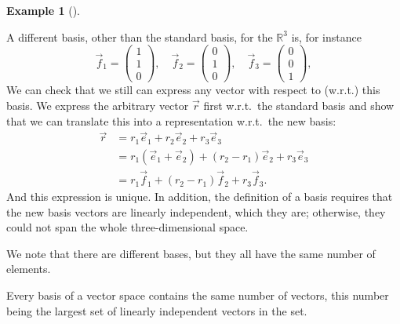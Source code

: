 \documentclass[
  a4paper,
  DIV=11,
  numbers=noendperiod,
  oneside]{scrreprt}
\theoremstyle{definition}
\newtheorem{example}{Example}[chapter]
\theoremstyle{remark}
\newenvironment{fbxSimple}[3]{\begin{tcolorbox}[enhanced, breakable,%
attach boxed title to top*={xshift=1.4pt},
boxed title style={boxrule=0.0mm, fuzzy shadow={1pt}{-1pt}{0mm}{0.1mm}{gray}, arc=.3em, rounded corners=east, sharp corners=west}, colframe=#1-color2, colbacktitle=#1-color1, colback = white, coltitle=black,  titlerule=0mm, toprule=0pt, bottomrule=.7pt, leftrule=.3em, rightrule=.7pt, outer arc=.3em,  	left=.5em, right=.5em, bottomtitle=1mm, toptitle=1mm,title=\textbf{#2}\hspace{0.5em}{#3}]}
{\end{tcolorbox}}
\begin{document}
\begin{example}[]\protect\hypertarget{exm-}{}\label{exm-}

A different basis, other than the standard basis, for the
\(\mathbb{R}^{3}\) is, for instance
\[\vec{f}_{1} =  \scriptscriptstyle \begin{pmatrix}   1\\ 1 \\ 0   \end{pmatrix} \textstyle, \quad \vec{f}_{2} =  \scriptscriptstyle \begin{pmatrix}   0\\ 1 \\ 0   \end{pmatrix} \textstyle, \quad \vec{f}_{3} =  \scriptscriptstyle \begin{pmatrix}   0\\ 0 \\ 1  \end{pmatrix} \textstyle,\]
We can check that we still can express any vector with respect to
(w.r.t.) this basis. We express the arbitrary vector \(\vec{r}\) first
w.r.t.~the standard basis and show that we can translate this into a
representation w.r.t.~the new basis: \[\begin{aligned}
 \vec{r} & = r_{1} \vec{e}_{1} + r_{2} \vec{e}_{2} +r_{3} \vec{e}_{3}  \\
  & = r_{1} (\vec{e}_{1} + \vec{e}_{2})  + (r_{2}-r_{1}) \vec{e}_{2} +r_{3} \vec{e}_{3}  \\
  & = r_{1} \vec{f}_{1} + (r_{2}-r_{1}) \vec{f}_{2} +r_{3} \vec{f}_{3}  .
\end{aligned}\] And this expression is unique. In addition, the
definition of a basis requires that the new basis vectors are linearly
independent, which they are; otherwise, they could not span the whole
three-dimensional space.

\end{example}

We note that there are different bases, but they all have the same
number of elements.

\label{number-of-elements-of-a-basis}
\begin{fbxSimple}{Theorem}{Theorem 2.7: }{Number of elements of a basis}
\label{number-of-elements-of-a-basis}
Every basis of a vector space contains the same number of vectors, this
number being the largest set of linearly independent vectors in the set.

\end{fbxSimple}
\end{document}
